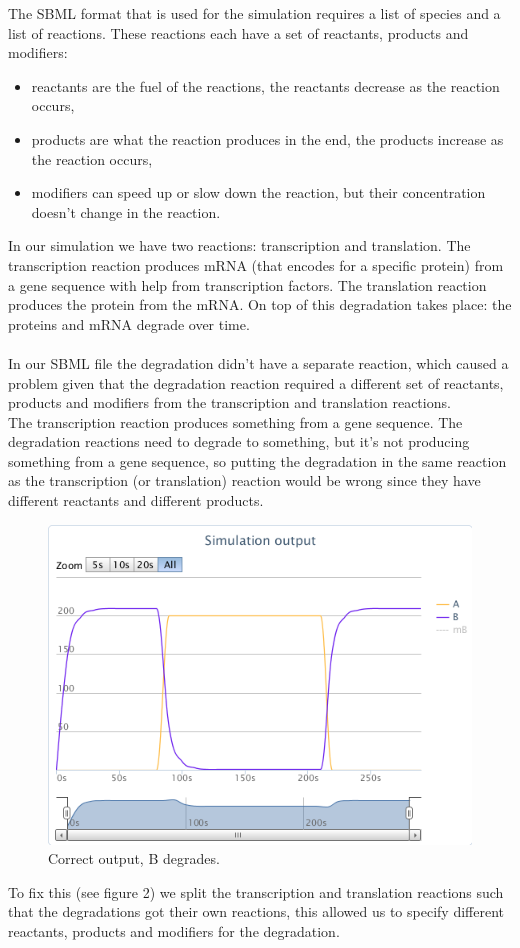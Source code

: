 \documentclass[a4paper]{article}
\begin{document}
\noindent The SBML format that is used for the simulation requires a list of species and a list of reactions. These reactions each have a set of reactants, products and modifiers:
\begin{itemize}
	\item reactants are the fuel of the reactions, the reactants decrease as the reaction occurs,
	\item products are what the reaction produces in the end, the products increase as the reaction occurs,
	\item modifiers can speed up or slow down the reaction, but their concentration doesn't change in the reaction.
\end{itemize}
In our simulation we have two reactions: transcription and translation. The transcription reaction produces mRNA (that encodes for a specific protein) from a gene sequence with help from transcription factors. The translation reaction produces the protein from the mRNA. On top of this degradation takes place: the proteins and mRNA degrade over time.\\
\\
In our SBML file the degradation didn't have a separate reaction, which caused a problem given that the degradation reaction required a different set of reactants, products and modifiers from the transcription and translation reactions.\\
The transcription reaction produces something from a gene sequence. The degradation reactions need to degrade to something, but it's not producing something from a gene sequence, so putting the degradation in the same reaction as the transcription (or translation) reaction would be wrong since they have different reactants and different products.\\

\begin{figure}
	\centering\includegraphics[scale=0.5]{../../screenshots/2012-06-14-not-output.png}
	\caption{Correct output, B degrades.}
\end{figure}

\noindent To fix this (see figure 2) we split the transcription and translation reactions such that the degradations got their own reactions, this allowed us to specify different reactants, products and modifiers for the degradation.
\end{document}
